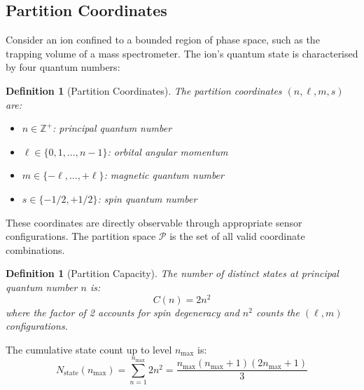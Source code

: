 \documentclass[twocolumn,10pt]{article}
\newtheorem{definition}[theorem]{Definition}
\newcommand{\Nstate}{N_{\mathrm{state}}}
\begin{document}
\subsection{Partition Coordinates}

Consider an ion confined to a bounded region of phase space, such as the trapping volume of a mass spectrometer. The ion's quantum state is characterised by four quantum numbers:

\begin{definition}[Partition Coordinates]
\label{def:partition}
The partition coordinates $(n, \ell, m, s)$ are:
\begin{itemize}
    \item $n \in \mathbb{Z}^+$: principal quantum number
    \item $\ell \in \{0, 1, \ldots, n-1\}$: orbital angular momentum
    \item $m \in \{-\ell, \ldots, +\ell\}$: magnetic quantum number
    \item $s \in \{-1/2, +1/2\}$: spin quantum number
\end{itemize}
\end{definition}

These coordinates are directly observable through appropriate sensor configurations. The partition space $\mathcal{P}$ is the set of all valid coordinate combinations.

\begin{definition}[Partition Capacity]
\label{def:capacity}
The number of distinct states at principal quantum number $n$ is:
\begin{equation}
    C(n) = 2n^2
\end{equation}
where the factor of 2 accounts for spin degeneracy and $n^2$ counts the $(\ell, m)$ configurations.
\end{definition}

The cumulative state count up to level $n_{\max}$ is:
\begin{equation}
    \Nstate(n_{\max}) = \sum_{n=1}^{n_{\max}} 2n^2 = \frac{n_{\max}(n_{\max}+1)(2n_{\max}+1)}{3}
\end{equation}
\end{document}
